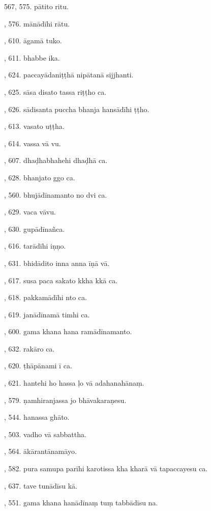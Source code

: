 567, 575. pātito ritu.\par {}, 576. mānādīhi rātu.\par {}, 610. āgamā tuko.\par {}, 611. bhabbe ika.\par {}, 624. paccayādaniṭṭhā nipātanā sijjhanti.\par {}, 625. sāsa disato tassa riṭṭho ca.\par {}, 626. sādisanta puccha bhanja hansādīhi ṭṭho.\par {}, 613. vasato uṭṭha.\par {}, 614. vassa vā vu.\par {}, 607. dhaḍhabhahehi dhaḍhā ca.\par {}, 628. bhanjato ggo ca.\par {}, 560. bhujādīnamanto no dvi ca.\par {}, 629. vaca vāvu.\par {}, 630. gupādīnañca.\par {}, 616. tarādīhi iṇṇo.\par {}, 631. bhidādito inna anna īṇā vā.\par {}, 617. susa paca sakato kkha kkā ca.\par {}, 618. pakkamādīhi nto ca.\par {}, 619. janādīnamā timhi ca.\par {}, 600. gama khana hana ramādīnamanto.\par {}, 632. rakāro ca.\par {}, 620. ṭhāpānami ī ca.\par {}, 621. hantehi ho hassa ḷo vā adahanahānaṃ.\par {}, 579. ṇamhiranjassa jo bhāvakaraṇesu.\par {}, 544. hanassa ghāto.\par {}, 503. vadho vā sabbattha.\par {}, 564. ākārantānamāyo.\par {}, 582. pura samupa parīhi karotissa kha kharā vā tapaccayesu ca.\par {}, 637. tave tunādīsu kā.\par {}, 551. gama khana hanādīnaṃ tuṃ tabbādīsu na.\par \noindent
